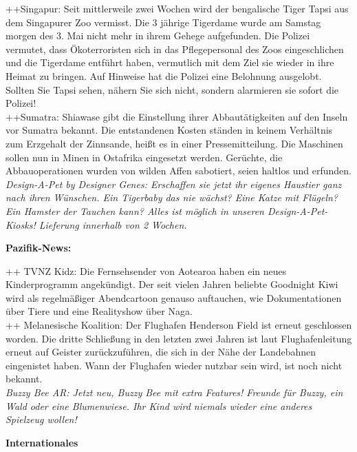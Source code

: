 \documentclass[final]{multiversum}
\begin{document}
++Singapur: Seit mittlerweile zwei Wochen wird der bengalische Tiger Tapsi aus
dem Singapurer Zoo vermisst. Die 3 jährige Tigerdame wurde am Samstag morgen des
3. Mai nicht mehr in ihrem Gehege aufgefunden. Die Polizei vermutet, dass
Ökoterroristen sich in das Pflegepersonal des Zoos eingeschlichen und die
Tigerdame entführt haben, vermutlich mit dem Ziel sie wieder in ihre Heimat zu
bringen. Auf Hinweise hat die Polizei eine Belohnung ausgelobt. Sollten Sie
Tapsi sehen, nähern Sie sich nicht, sondern alarmieren sie sofort die Polizei!\\
\indent ++Sumatra: Shiawase gibt die Einstellung ihrer Abbautätigkeiten auf den Inseln
vor Sumatra bekannt. Die entstandenen Kosten ständen in keinem Verhältnis zum
Erzgehalt der Zinnsande, heißt es in einer Pressemitteilung. Die Maschinen
sollen nun in Minen in Ostafrika eingesetzt werden. Gerüchte, die
Abbauoperationen wurden von wilden Affen sabotiert, seien haltlos und erfunden.\\
\indent \textit{Design-A-Pet by Designer Genes: Erschaffen sie jetzt ihr eigenes
Haustier ganz nach ihren Wünschen. Ein Tigerbaby das nie wächst? Eine Katze mit
Flügeln? Ein Hamster der Tauchen kann? Alles ist möglich in unseren
Design-A-Pet-Kiosks! Lieferung innerhalb von 2 Wochen.}

\textbf{Pazifik-News:}

++ TVNZ Kidz: Die Fernsehsender von Aotearoa haben ein neues Kinderprogramm
angekündigt. Der seit vielen Jahren beliebte Goodnight Kiwi wird als
regelmäßiger Abendcartoon genauso auftauchen, wie Dokumentationen über Tiere und
eine Realityshow über Naga.\\
\indent ++ Melanesische Koalition: Der Flughafen Henderson Field ist erneut geschlossen
worden. Die dritte Schließung in den letzten zwei Jahren ist laut
Flughafenleitung erneut auf Geister zurückzuführen, die sich in der Nähe der
Landebahnen eingenistet haben. Wann der Flughafen wieder nutzbar sein wird,
ist noch nicht bekannt.\\
\indent \textit{Buzzy Bee AR: Jetzt neu, Buzzy Bee mit extra Features! Freunde für
Buzzy, ein Wald oder eine Blumenwiese. Ihr Kind wird niemals wieder eine anderes
Spielzeug wollen!}

\textbf{Internationales}
\end{document}
